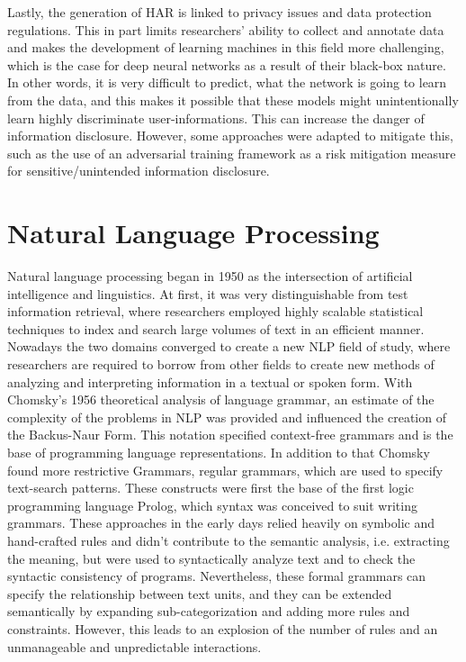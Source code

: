 Lastly, the generation of HAR is linked to privacy issues and data protection regulations. This in part limits researchers' ability to collect and annotate data and makes the development of learning machines in this field more challenging, which is the case for deep neural networks as a result of their black-box nature. In other words, it is very difficult to predict, what the network is going to learn from the data, and this makes it possible that these models might unintentionally learn highly discriminate user-informations. This can increase the danger of information disclosure. However, some approaches were adapted to mitigate this, such as the use of an adversarial training framework as a risk mitigation measure for sensitive/unintended information disclosure\cite{iwasawa2017privacy}.
\section{Natural Language Processing}\label{sec:nlp}
Natural language processing began in 1950 as the intersection of artificial intelligence and linguistics. At first, it was very distinguishable from test information retrieval, where researchers employed highly scalable statistical techniques to index and search large volumes of text in an efficient manner\cite{nadkarni2011natural}. Nowadays the two domains converged to create a new NLP field of study, where researchers are required to borrow from other fields to create new methods of analyzing and interpreting information in a textual or spoken form.\newline
With Chomsky's 1956 theoretical analysis of language grammar, an estimate of the complexity of the problems in NLP was provided and influenced the creation of the Backus-Naur Form. This notation specified context-free grammars and is the base of programming language representations. In addition to that Chomsky found more restrictive Grammars, regular grammars, which are used to specify text-search patterns\cite{nadkarni2011natural}. These constructs were first the base of the first logic programming language Prolog, which syntax was conceived to suit writing grammars.\newline
These approaches in the early days relied heavily on symbolic and hand-crafted rules and didn't contribute to the semantic analysis, i.e. extracting the meaning, but were used to syntactically analyze text and to check the syntactic consistency of programs. Nevertheless, these formal grammars can specify the relationship between text units, and they can be extended semantically by expanding sub-categorization and adding more rules and constraints. However, this leads to an explosion of the number of rules and an unmanageable and unpredictable interactions\cite{nadkarni2011natural}.\newline

